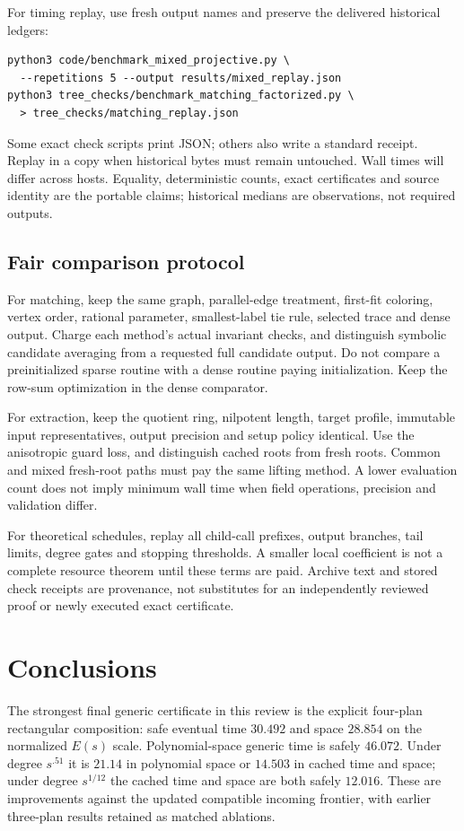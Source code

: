 \documentclass[11pt,letterpaper]{article}
\theoremstyle{remark}\newtheorem{remark}[theorem]{Remark}
\begin{document}
For timing replay, use fresh output names and preserve the delivered historical ledgers:
\begin{verbatim}
python3 code/benchmark_mixed_projective.py \
  --repetitions 5 --output results/mixed_replay.json
python3 tree_checks/benchmark_matching_factorized.py \
  > tree_checks/matching_replay.json
\end{verbatim}
Some exact check scripts print JSON; others also write a standard receipt. Replay in a copy when historical bytes must remain untouched. Wall times will differ across hosts. Equality, deterministic counts, exact certificates and source identity are the portable claims; historical medians are observations, not required outputs.

\subsection{Fair comparison protocol}
For matching, keep the same graph, parallel-edge treatment, first-fit coloring, vertex order, rational parameter, smallest-label tie rule, selected trace and dense output. Charge each method's actual invariant checks, and distinguish symbolic candidate averaging from a requested full candidate output. Do not compare a preinitialized sparse routine with a dense routine paying initialization. Keep the row-sum optimization in the dense comparator.

For extraction, keep the quotient ring, nilpotent length, target profile, immutable input representatives, output precision and setup policy identical. Use the anisotropic guard loss, and distinguish cached roots from fresh roots. Common and mixed fresh-root paths must pay the same lifting method. A lower evaluation count does not imply minimum wall time when field operations, precision and validation differ.

For theoretical schedules, replay all child-call prefixes, output branches, tail limits, degree gates and stopping thresholds. A smaller local coefficient is not a complete resource theorem until these terms are paid. Archive text and stored check receipts are provenance, not substitutes for an independently reviewed proof or newly executed exact certificate.

\section{Conclusions}
The strongest final generic certificate in this review is the explicit four-plan rectangular composition: safe eventual time $30.492$ and space $28.854$ on the normalized $E(s)$ scale. Polynomial-space generic time is safely $46.072$. Under degree $s^{.51}$ it is $21.14$ in polynomial space or $14.503$ in cached time and space; under degree $s^{1/12}$ the cached time and space are both safely $12.016$. These are improvements against the updated compatible incoming frontier, with earlier three-plan results retained as matched ablations.
\end{document}

